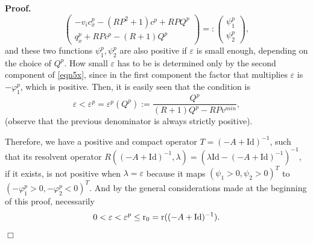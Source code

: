 \documentclass[a4paper]{article}
\def\Id{\rm{Id}}
\def\r{{\rm{r}}}
\def\Id{\mathrm{Id}}
\numberwithin{equation}{section}
\newenvironment{pf}{\vspace{0.5em}\noindent\textbf{Proof.} }{\quad \hfill $\Box$ \\ \vspace{0.2em}\\}
\begin{document}
\begin{pf}
\begin{equation}
\left( \begin{array}{cc}
-v_i c^p_x-(RP^2+1)c^p+RPQ^p\\
q_x^p+RPc^p-(R+1)Q^p
\end{array}
\right)= :
\left( \begin{array}{cc}
\psi_1^p\\
\psi_2^p
\end{array}
\right),
\end{equation}
and these two functions $\psi_1^p,\psi_2^p$ are also positive if $\varepsilon$ is small enough, depending on the choice of $Q^p$. How small $ \varepsilon$ has to be is determined only by the second component of \eqref{eqn5x}, since in the first component the factor that multiplies $\varepsilon$ is $-\varphi_1^p$, which is positive. Then, it is easily seen that the condition is
\begin{equation*}%
\varepsilon<\varepsilon^p=\varepsilon^p(Q^p):= \dfrac{Q^p}{(R+1)Q^p-RP v^{min}},
\end{equation*}
(observe that the previous denominator is always strictly positive).


Therefore, we have a positive and compact operator $T=(-A+\Id)^{-1}$, such that its resolvent operator $R((-A+\Id)^{-1},\lambda)=\left(\lambda\Id-(-A+\Id)^{-1}\right)^{-1}$, if it exists, is not positive when
$\lambda=\varepsilon$ because it maps $(\psi_1>0,\psi_2>0)^T$ to $(-\varphi^p_1>0,-\varphi^p_2<0)^T$. And by the general considerations made at the beginning of this proof, necessarily
\begin{equation}\label{eq:eps0r0}
0<\varepsilon < \varepsilon^p\le \r_0={\rm r}((-A+\Id)^{-1}).
\end{equation}
\end{pf}
\end{document}
